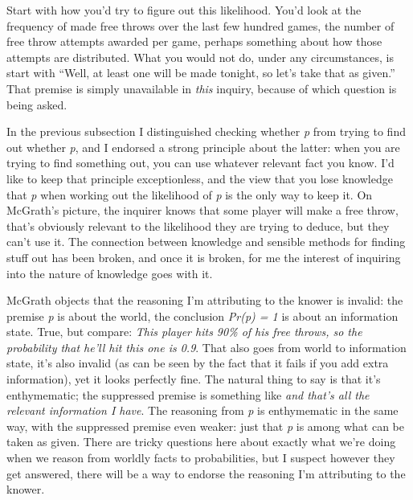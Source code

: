 \documentclass[
  11pt,
  letterpaper,
  DIV=11,
  numbers=noendperiod,
  twoside]{scrartcl}
\begin{document}
Start with how you'd try to figure out this likelihood. You'd look at
the frequency of made free throws over the last few hundred games, the
number of free throw attempts awarded per game, perhaps something about
how those attempts are distributed. What you would not do, under any
circumstances, is start with ``Well, at least one will be made tonight,
so let's take that as given.'' That premise is simply unavailable in
\emph{this} inquiry, because of which question is being asked.

In the previous subsection I distinguished checking whether \emph{p}
from trying to find out whether \emph{p}, and I endorsed a strong
principle about the latter: when you are trying to find something out,
you can use whatever relevant fact you know. I'd like to keep that
principle exceptionless, and the view that you lose knowledge that
\emph{p} when working out the likelihood of \emph{p} is the only way to
keep it. On McGrath's picture, the inquirer knows that some player will
make a free throw, that's obviously relevant to the likelihood they are
trying to deduce, but they can't use it. The connection between
knowledge and sensible methods for finding stuff out has been broken,
and once it is broken, for me the interest of inquiring into the nature
of knowledge goes with it.

McGrath objects that the reasoning I'm attributing to the knower is
invalid: the premise \emph{p} is about the world, the conclusion
\emph{Pr(p) = 1} is about an information state. True, but compare:
\emph{This player hits 90\% of his free throws, so the probability that
he'll hit this one is 0.9}. That also goes from world to information
state, it's also invalid (as can be seen by the fact that it fails if
you add extra information), yet it looks perfectly fine. The natural
thing to say is that it's enthymematic; the suppressed premise is
something like \emph{and that's all the relevant information I have}.
The reasoning from \emph{p} is enthymematic in the same way, with the
suppressed premise even weaker: just that \emph{p} is among what can be
taken as given. There are tricky questions here about exactly what we're
doing when we reason from worldly facts to probabilities, but I suspect
however they get answered, there will be a way to endorse the reasoning
I'm attributing to the knower.
\end{document}
